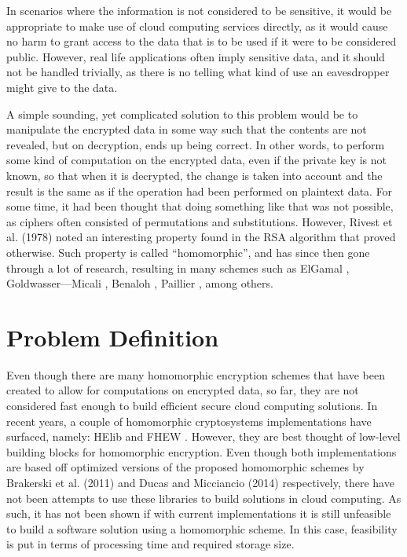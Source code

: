 In scenarios where the information is not considered to be sensitive, it would be appropriate to make use of cloud computing services directly, as it would cause no harm to grant access to the data that is to be used if it were to be considered public. However, real life applications often imply sensitive data, and it should not be handled trivially, as there is no telling what kind of use an eavesdropper might give to the data.

A simple sounding, yet complicated solution to this problem would be to manipulate the encrypted data in some way such that the contents are not revealed, but on decryption, ends up being correct. In other words, to perform some kind of computation on the encrypted data, even if the private key is not known, so that when it is decrypted, the change is taken into account and the result is the same as if the operation had been performed on plaintext data. For some time, it had been thought that doing something like that was not possible, as ciphers often consisted of permutations and substitutions. However, Rivest et al. (1978) \cite{rivest1978data} noted an interesting property found in the RSA algorithm that proved otherwise. Such property is called ``homomorphic'', and has since then gone through a lot of research, resulting in many schemes such as ElGamal \cite{ElGamal:1985:PKC:19478.19480}, Goldwasser---Micali \cite{Goldwasser:1982:PEA:800070.802212}, Benaloh \cite{benaloh1994dense}, Paillier \cite{Paillier:1999:PCB:1756123.1756146}, among others.

\section{Problem Definition}

Even though there are many homomorphic encryption schemes that have been created to allow for computations on encrypted data, so far, they are not considered fast enough to build efficient secure cloud computing solutions. In recent years, a couple of homomorphic cryptosystems implementations have surfaced, namely: HElib \cite{helib} and FHEW \cite{fhew}. However, they are best thought of low-level building blocks for homomorphic encryption. Even though both implementations are based off optimized versions of the proposed homomorphic schemes by Brakerski et al. (2011) \cite{cryptoeprint:2011:277} and Ducas and Micciancio (2014) \cite{fhew} respectively, there have not been attempts to use these libraries to build solutions in cloud computing. As such, it has not been shown if with current implementations it is still unfeasible to build a software solution using a homomorphic scheme. In this case, feasibility is put in terms of processing time and required storage size. 

